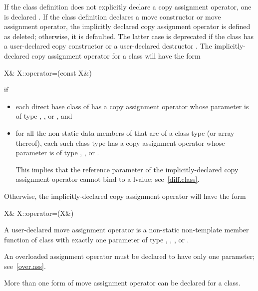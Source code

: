 \pnum
If the class definition does not explicitly declare a copy assignment operator,
one is declared .
If the class definition declares a move
constructor or move assignment operator, the implicitly declared copy
assignment operator is defined as deleted; otherwise, it is
defaulted.
The latter case is deprecated if the class has a user-declared copy constructor
or a user-declared destructor .
The implicitly-declared copy assignment operator for a class
will have the form
\begin{codeblock}
X& X::operator=(const X&)
\end{codeblock}
if
\begin{itemize}
\item
each direct base class  of 
has a copy assignment operator whose parameter is of type
, , or , and
\item
for all the non-static data members of 
that are of a class type  (or array thereof),
each such class type has a copy assignment operator whose parameter is of type
, ,
or .
\begin{footnote}
This implies that the reference parameter of the
implicitly-declared copy assignment operator cannot bind to a
 lvalue; see~\ref{diff.class}.
\end{footnote}
\end{itemize}

Otherwise, the implicitly-declared copy assignment operator
will have the form
\begin{codeblock}
X& X::operator=(X&)
\end{codeblock}

\pnum
A user-declared move assignment operator  is
a non-static non-template member function of class  with exactly
one parameter of type , , , or
.
\begin{note}
An overloaded assignment operator must be
declared to have only one parameter; see~\ref{over.ass}.
\end{note}
{}
\begin{note}
More than one form of move assignment operator can be declared for a class.
\end{note}

